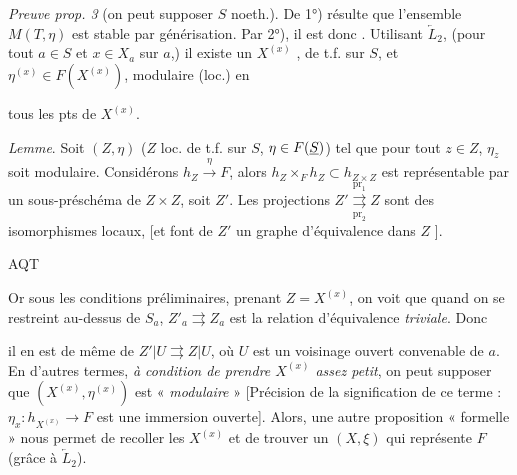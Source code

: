 \documentclass[11pt,a4paper]{article}
\begin{document}
\emph{Preuve prop. 3} (on peut supposer $S$ noeth.). De 1°) résulte que
l'ensemble \struck{\ill{}} $M(T, \eta)$ est stable par \struck{\ill{}}
générisation. Par 2°), il est donc . 
Utilisant $\underleftarrow{L}_2$, (pour tout $a \in S$ et $x \in X_a$ sur
$a$,) \struck{\ill{}} il existe \ill{} un \ill{} $X^{(x)}$ \struck{\ill{}}
, \struck{\ill{}} de t.f. sur $S$, et
$\eta^{(x)} \in F(X^{(x)})$, modulaire (loc.) en

tous les pts de $X^{(x)}$.

\emph{Lemme}. Soit $(Z, \eta)$ ($Z$ loc. de t.f. sur $S$,
$\eta \in F(\uncertain{S})$) tel que pour tout $z \in Z$, $\eta_z$ soit
modulaire. Considérons $h_Z \xrightarrow{\eta} F$,  alors
$h_Z \times_F h_Z \subset h_{Z \times Z}$ est représentable par un
sous-préschéma de $Z \times Z$, soit $Z'$. Les projections
$Z' \overset{\mathrm{pr}_1}{\underset{\mathrm{pr}_2}{\rightrightarrows}} Z$
sont des isomorphismes locaux, [et font de $Z'$ un  graphe
d'équivalence dans $Z$ \ill{}].

AQT

Or sous les conditions préliminaires, prenant $Z = X^{(x)}$, on voit que
quand on se restreint au-dessus de $S_a$,
$Z'_a \rightrightarrows Z_a$ est la relation d'équivalence \emph{triviale}.
Donc

il en est de même de $Z' | U \rightrightarrows Z | U$, où $U$ est un
voisinage ouvert convenable de $a$. En d'autres termes, \emph{à condition de
prendre $X^{(x)}$ assez petit}, on peut supposer que
$(X^{(x)}, \eta^{(x)})$ est «  \emph{modulaire} »
[Précision de la signification de ce terme :
$\eta_x : h_{X^{(x)}} \to F$ est une immersion ouverte]. Alors, une autre
proposition « formelle » nous permet de recoller les $X^{(x)}$ et de trouver
un $(X, \xi)$ qui représente $F$ (grâce à $\underleftarrow{L}_2$).
\end{document}
